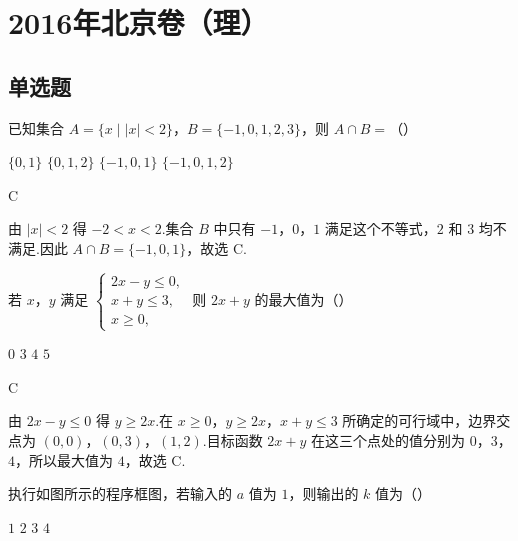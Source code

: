 
\chapter{2016年北京卷（理）}

\section{单选题}

\begin{problem}
已知集合 \(A=\{x\mid |x|<2\}\)，\(B=\{-1,0,1,2,3\}\)，则 \(A\cap B=\)（\quad）

\choices
    {\(\{0,1\}\)}
    {\(\{0,1,2\}\)}
    {\(\{-1,0,1\}\)}
    {\(\{-1,0,1,2\}\)}
\end{problem}

\begin{answer}
C
\end{answer}

\begin{solution}
由 \(|x|<2\) 得 \(-2<x<2\).集合 \(B\) 中只有 \(-1\)，\(0\)，\(1\) 满足这个不等式，\(2\) 和 \(3\) 均不满足.因此
\(A\cap B=\{-1,0,1\}\)，故选 C.
\end{solution}

\begin{problem}
若 \(x\)，\(y\) 满足 \(\begin{cases}
2x-y\le 0,\\
x+y\le 3,\\
x\ge 0,
\end{cases}\)
则 \(2x+y\) 的最大值为（\quad）

\choices
    {\(0\)}
    {\(3\)}
    {\(4\)}
    {\(5\)}
\end{problem}

\begin{answer}
C
\end{answer}

\begin{solution}
由 \(2x-y\le 0\) 得 \(y\ge 2x\).在 \(x\ge0\)，\(y\ge2x\)，\(x+y\le3\) 所确定的可行域中，边界交点为 \((0,0)\)，\((0,3)\)，\((1,2)\).目标函数 \(2x+y\) 在这三个点处的值分别为 \(0\)，\(3\)，\(4\)，所以最大值为 \(4\)，故选 C.
\end{solution}

\begin{problem}
执行如图所示的程序框图，若输入的 \(a\) 值为 \(1\)，则输出的 \(k\) 值为（\quad）


\choices
    {\(1\)}
    {\(2\)}
    {\(3\)}
    {\(4\)}
\end{problem}

